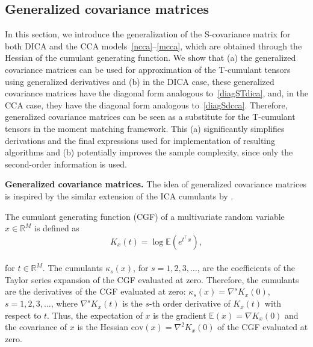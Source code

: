 \documentclass{article}
\newcommand{\ppp}{\textbf}
\newcommand{\R}{\mathbb{R}}
\newcommand{\ebb}{\mathbb{E}}
\newcommand{\cov}{\mathrm{cov}}
\begin{document}
 




\subsection{Generalized covariance matrices}
\label{sec:generalized-covariances}
In this section, we introduce the generalization of the S-covariance matrix for both  DICA and the CCA models~\eqref{ncca}--\eqref{mcca},
which are obtained through the Hessian of the cumulant generating function. We show that (a) the generalized covariance matrices can be used for approximation of the T-cumulant tensors using generalized derivatives and (b) in the DICA case, these generalized covariance matrices have the diagonal form analogous to~\eqref{diagSTdica}, and, in the CCA case, they have the diagonal form analogous to~\eqref{diagSdcca}. 
Therefore, generalized covariance matrices can be seen as a substitute for the T-cumulant tensors in the moment matching framework. This (a) significantly simplifies derivations and the final expressions used for implementation of resulting algorithms and (b)  potentially improves the sample complexity, since only the second-order information is used.





\ppp{Generalized covariance matrices.} The idea of generalized covariance matrices is inspired by the similar extension of the ICA cumulants by \citet{Yer2000}. 

The cumulant generating function (CGF) of a multivariate random variable $x\in\R^M$ is defined as
\\[-0.9em]
\begin{equation}\label{cgf}
K_x(t) = \log { \ebb ( e^{t^{\top}x} ) },
\end{equation}
\\[-1.4em]
for $t\in\R^M$. The cumulants $\kappa_s(x)$, for $s=1,2,3,\dots$, are the coefficients of the Taylor series expansion of the CGF evaluated at zero. Therefore, the cumulants are the derivatives of the CGF evaluated at zero:
$\kappa_s(x) = \nabla^s K_x(0)$, $s=1,2,3,\dots$, where $\nabla^sK_x(t)$ is the $s$-th order derivative of $K_x(t)$ with respect to $t$. Thus, the expectation of $x$ is the gradient $\ebb(x) = \nabla K_x(0)$ and the covariance of $x$ is the Hessian $\cov(x)=\nabla^2 K_x(0)$ of the CGF evaluated at zero.
\end{document}
